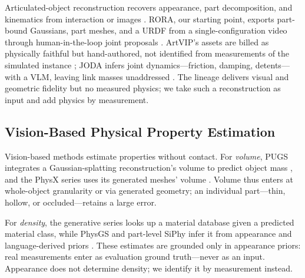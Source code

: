 Articulated-object reconstruction recovers appearance, part decomposition, and
kinematics from interaction or images
\cite{jiang2022ditto}.
RORA, our starting point, exports part-bound Gaussians, part meshes, and a
URDF from a single-configuration video through human-in-the-loop joint
proposals \cite{lee2026rora}. ArtVIP's assets are billed as physically
faithful but hand-authored, not identified from measurements of the simulated
instance \cite{artvip2026}; JODA infers joint dynamics---friction, damping,
detents---with a VLM, leaving link masses unaddressed \cite{joda2026}. The lineage delivers visual and
geometric fidelity but no measured physics; we take such a reconstruction as
input and add physics by measurement.

\subsection{Vision-Based Physical Property Estimation}

Vision-based methods estimate properties without contact. For \emph{volume},
PUGS integrates a Gaussian-splatting reconstruction's volume to predict object
mass \cite{shuai2025pugs}, and the PhysX series uses its
generated meshes' volume
\cite{cao2026physxomni}.
Volume thus enters at whole-object granularity or via generated geometry; an individual part---thin, hollow, or occluded---retains a large
error.

For \emph{density}, the generative series looks up a material database given a
predicted material class, while PhysGS and part-level SiPhy infer it from
appearance and language-derived priors
\cite{chopra2026physgs,le2026siphy}.
These estimates are grounded only in appearance priors: real measurements enter
as evaluation ground truth---never as an input. Appearance does
not determine density; we identify it by measurement instead.

